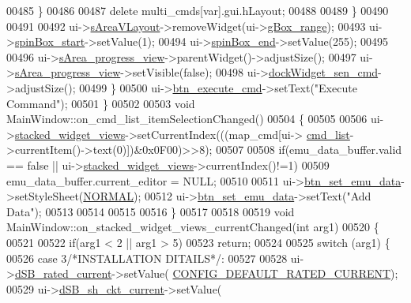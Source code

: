 \begin{DoxyCode}
00485             \}
00486 
00487             \textcolor{keyword}{delete} multi\_cmds[var].gui.hLayout;
00488 
00489         \}
00490 
00491 
00492     ui->\hyperlink{a00080_a2bdce9ad313cd4ee575613f36cbc4678}{sAreaVLayout}->removeWidget(ui->\hyperlink{a00080_a3c12d0504a310784c3820d1a9ad469c2}{gBox\_range});
00493     ui->\hyperlink{a00080_acb4d6609c580645dac5aee1f1ad59d01}{spinBox\_start}->setValue(1);
00494     ui->\hyperlink{a00080_a8ebeb5caa10878d7806d1f548913b449}{spinBox\_end}->setValue(255);
00495 
00496     ui->\hyperlink{a00080_ae4fe44aa026dd0e84e0f10cdcabca504}{sArea\_progress\_view}->parentWidget()->adjustSize();
00497     ui->\hyperlink{a00080_ae4fe44aa026dd0e84e0f10cdcabca504}{sArea\_progress\_view}->setVisible(\textcolor{keyword}{false});
00498     ui->\hyperlink{a00080_a9eb86a5ee396766f0f4a65f2d2bd7688}{dockWidget\_sen\_cmd}->adjustSize();
00499     \}
00500     ui->\hyperlink{a00080_a9ea50d44e38316e4203933698cbc14a6}{btn\_execute\_cmd}->setText(\textcolor{stringliteral}{"Execute Command"});
00501 \}
00502 
00503 \textcolor{keywordtype}{void} MainWindow::on\_cmd\_list\_itemSelectionChanged()
00504 \{
00505 
00506     ui->\hyperlink{a00080_a59e39bd3d716004e840a5be5dda18b96}{stacked\_widget\_views}->setCurrentIndex(((map\_cmd[ui->
      \hyperlink{a00080_aa66ece71395b435e915d384fb63bac1d}{cmd\_list}->currentItem()->text(0)])&0x0F00)>>8);
00507 
00508     \textcolor{keywordflow}{if}(emu\_data\_buffer.valid == \textcolor{keyword}{false} || ui->\hyperlink{a00080_a59e39bd3d716004e840a5be5dda18b96}{stacked\_widget\_views}->currentIndex()!=1)
00509     emu\_data\_buffer.current\_editor = NULL;
00510 
00511     ui->\hyperlink{a00080_ad05944ce9c8afb0ab60549a326b8e0af}{btn\_set\_emu\_data}->setStyleSheet(\hyperlink{a00090_a1291f416b069313021b519eea62d5bf1}{NORMAL});
00512     ui->\hyperlink{a00080_ad05944ce9c8afb0ab60549a326b8e0af}{btn\_set\_emu\_data}->setText(\textcolor{stringliteral}{"Add Data"});
00513 
00514 
00515 
00516 \}
00517 
00518 
00519 \textcolor{keywordtype}{void} MainWindow::on\_stacked\_widget\_views\_currentChanged(\textcolor{keywordtype}{int} arg1)
00520 \{
00521 
00522     \textcolor{keywordflow}{if}(arg1 < 2 || arg1 > 5)
00523         \textcolor{keywordflow}{return};
00524 
00525     \textcolor{keywordflow}{switch} (arg1) \{
00526         \textcolor{keywordflow}{case} 3\textcolor{comment}{/*INSTALLATION DITAILS*/}:
00527 
00528              ui->\hyperlink{a00080_ab6d7c3a292c79cd73aff8735df48d30e}{dSB\_rated\_current}->setValue(
      \hyperlink{a00086_ae329eb408f386777cbb443c27ca7c1c5}{CONFIG\_DEFAULT\_RATED\_CURRENT});
00529              ui->\hyperlink{a00080_aab5fcfd5ceedb9c4e853139113f5c753}{dSB\_sh\_ckt\_current}->setValue(

\end{DoxyCode}
